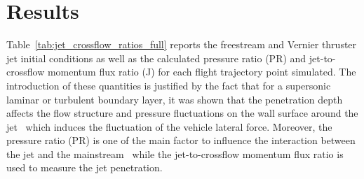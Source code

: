 \documentclass[12pt]{article}
\begin{document}
\section{Results}\label{sec:results}
Table~\ref{tab:jet_crossflow_ratios_full} reports the freestream and Vernier thruster jet initial conditions as well as the calculated pressure ratio (PR) and jet-to-crossflow momentum flux ratio (J) for each flight trajectory point simulated. The introduction of these quantities is justified by the fact that for a supersonic laminar or turbulent boundary layer, it was shown that the penetration depth affects the flow structure and pressure fluctuations on the wall surface around the jet~\cite{Sun_Hu_2018,Xiao31122024} which induces the fluctuation of the vehicle lateral force. Moreover, the pressure ratio (PR) is one of the main factor to influence the interaction between the jet and the mainstream~\cite{Zhang01012020} while the jet-to-crossflow momentum flux ratio is used to measure the jet penetration.
\end{document}
